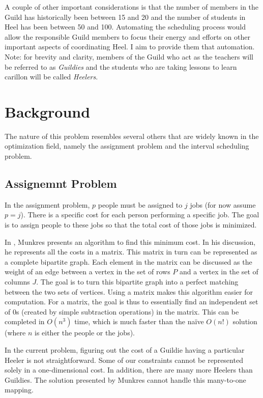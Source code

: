 \documentclass[letterpaper]{article}
\begin{document}
A couple of other important considerations is that the number of members in the Guild has historically been between 15
and 20 and the number of students in Heel has been between 50 and 100. Automating the scheduling process would allow the
responsible Guild members to focus their energy and efforts on other important aspects of coordinating Heel. I aim to
provide them that automation. Note: for brevity and clarity, members of the Guild who act as the teachers will be referred to
as \textit{Guildies} and the students who are taking lessons to learn carillon will be called \textit{Heelers}.

\section{Background} 
The nature of this problem resembles several others that are widely known in the optimization field, namely the assignment
problem and the interval scheduling problem.

\subsection{Assignemnt Problem}
In the assignment problem, $p$ people must be assigned to $j$ jobs (for now assume $p = j$). There is a specific cost for
each person performing a specific job. The goal is to assign people to these jobs so that the total cost of those jobs
is minimized. 

In \cite{munkres}, Munkres presents an algorithm to find this minimum cost. In his discussion, he represents all the
costs in a matrix. This matrix in turn can be represented as a complete bipartite graph. Each element in the matrix can
be discussed as the weight of an edge between a vertex in the set of rows $P$ and a vertex in the set of columns $J$.
The goal is to turn this bipartite graph into a perfect matching between the two sets of vertices. Using a matrix makes
this algorithm easier for computation. For a matrix, the goal is thus to essentially find an independent set of 0s
(created by simple subtraction operations) in the matrix. This can be completed in $O(n^3)$ time, which is much faster
than the na{\"i}ve $O(n!)$ solution (where $n$ is either the people or the jobs).

In the current problem, figuring out the cost of a Guildie having a particular Heeler is not straightforward. Some of
our constraints cannot be represented solely in a one-dimensional cost. In addition, there are many more Heelers than
Guildies. The solution presented by Munkres cannot handle this many-to-one mapping.
\end{document}
